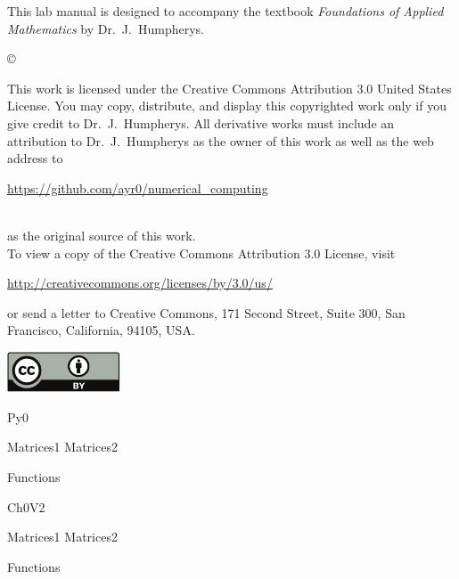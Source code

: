 \documentclass{newsiambook}
\begin{document}
\begin{thepreface}
This lab manual is designed to accompany the textbook \emph{Foundations of Applied Mathematics} by Dr.~J.~Humpherys.

\vfill
\copyright{This work is licensed under the Creative Commons Attribution 3.0 United States 
License.  You may copy, distribute, and display this copyrighted work only if you give 
credit to Dr.~J.~Humpherys. All derivative works must include an attribution to Dr.~J.~Humpherys as the owner of this work as well as the web address to 
\\\centerline{\url{https://github.com/ayr0/numerical_computing}}\\ as the original source of 
this 
work.\\To view a copy of the Creative Commons Attribution 3.0 License, 
visit\\\centerline{\url{http://creativecommons.org/licenses/by/3.0/us/}} or send a letter to 
Creative Commons, 171 Second Street, Suite 300, San Francisco, California, 94105, USA.}

\vfill
\centering\includegraphics[height=1.2cm]{by}
\vfill
\end{thepreface}

\setcounter{tocdepth}{1}
\tableofcontents

\mainmatter


\begin{python}
{Py0}

{Matrices1}
{Matrices2}

{Functions}
\end{python}

\begin{matlab}
{Ch0V2}

{Matrices1}
{Matrices2}

{Functions}
\end{matlab}
\end{document}

